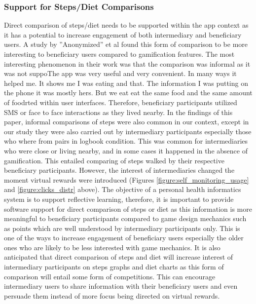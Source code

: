 \documentclass{sig-alternate}
\begin{document}
\subsubsection*{\textbf{Support for Steps/Diet Comparisons}}
Direct comparison of steps/diet needs to be supported within the app context as it has a potential to increase engagement of both intermediary and beneficiary users. A study by ''Anonymized'' et al \cite{katule2016:leveraging} found this form of comparison to be more interesting to beneficiary users compared to gamification features. The most interesting phenomenon in their work was that the comparison was informal as it was not suppoThe app was very useful and very convenient. In many ways it helped me.  It shows me I was eating and that. The information I was putting on the phone it was mostly hers. But we eat eat the same food and the same amount of foodrted within user interfaces. Therefore, beneficiary participants utilized SMS or face to face interactions as they lived nearby.\newline
In the findings of this paper, informal comparisons of steps were also common in our context, except in our study they were also carried out by intermediary participants especially those who where from pairs in logbook condition. This was common for intermediaries who were close or living nearby, and in some cases it happened in the absence of gamification. This entailed comparing of steps walked by their respective beneficiary participants. However, the interest of intermediaries changed the moment virtual rewards were introduced (Figures \ref{figure:self_monitoring_usage} and \ref{figure:clicks_distr} above). The objective of a personal health informatics system is to support reflective learning, therefore, it is important to provide software support for direct comparison of steps or diet as this information is more meaningful to beneficiary participants compared to game design mechanics such as points which are well understood by intermediary participants only. This is one of the ways to increase engagement of beneficiary users especially the older ones who are likely to be less interested with game mechanics. It is also anticipated that direct comparison of steps and diet will increase interest of intermediary participants on steps graphs and diet charts as this form of comparison will entail some form of competitions. This can encourage intermediary users to share information with their beneficiary users and even persuade them instead of more focus being directed on virtual rewards.
\end{document}

